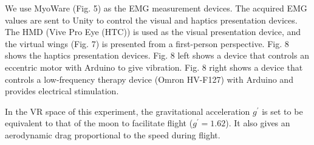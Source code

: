 \documentclass[letterpaper, 10 pt, conference]{ieeeconf}  %
\begin{document}
                We use MyoWare (Fig. 5) as the EMG measurement devices. 
                The acquired EMG values are sent to Unity to control the visual and haptics presentation devices.  
                The HMD (Vive Pro Eye (HTC)) is used as the visual presentation device, and the virtual wings (Fig. 7) is presented from a first-person perspective.  
                Fig. 8 shows the haptics presentation devices.  
                Fig. 8 left shows a device that controls an eccentric motor with Arduino to give vibration.  
                Fig. 8 right shows a device that controls a low-frequency therapy device (Omron HV-F127) with Arduino and provides electrical stimulation.  

                In the VR space of this experiment, the gravitational acceleration $g^{\prime}$ is set to be equivalent to that of the moon 
                to facilitate flight ($g^{\prime}=1.62$).
                It also gives an aerodynamic drag 
                proportional to the speed
                during flight.  
\end{document}
